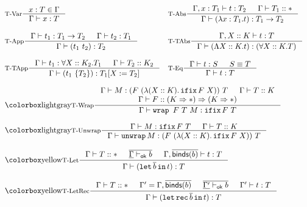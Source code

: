 \begin{figure}[!t]
  \centering
  \begin{displaymath}
  \begin{array}{ll}
  \inference[T-Var]{x:T \in \Gamma}{\Gamma |- x:T}  &
  \inference[T-Abs]{\Gamma, x:T_1 |- t:T_2 & \Gamma |- T_1 :: \Type}{\Gamma |- (\lambda x:T_1.t) : T_1 -> T_2} \\
  \\
  \inference[T-App]{\Gamma |- t_1 : T_1 -> T_2 & \Gamma |- t_2 : T_1}{\Gamma |- (t_1 ~ t_2) : T_2} &
  \inference[T-TAbs]{\Gamma, X::K |- t:T }{\Gamma |- (\Lambda X::K.t) : (\forall X::K.T)} \\
  \\
  \inference[T-TApp]{\Gamma |- t_1: \forall X::K_2.T_1  & \Gamma |- T_2 :: K_2} {\Gamma |- (t_1 ~\{T_2\}) : \substIn{X}{T_2}{T_1}} &
  \inference[T-Eq]{\Gamma |- t : S & S \equiv T}{\Gamma |- t : T} \\
  \\
  \multicolumn{2}{l}{\fomfDiff{\inference[T-Wrap]{\Gamma |- M: (F ~( \lambda (X :: K). \ifix F ~X)) ~T & \Gamma |- T:: K \\ \Gamma |- F :: (K\kindArrow\Type)\kindArrow (K\kindArrow\Type)}
          {\Gamma |- \wrap ~ F ~ T ~ M : \ifix F ~T} } }\\
  \\
  \multicolumn{2}{l}{\fomfDiff{\inference[T-Unwrap]{\Gamma |- M : \ifix F ~T & \Gamma |- T :: K }
          {\Gamma |- \unwrap M : (F ~( \lambda (X :: K). \ifix F ~X)) ~T  } } }\\
  \\
  \multicolumn{2}{l}{\firDiff{\inference[T-Let]{
  \Gamma |- T :: \Type &
  \seq{\fixed{\Gamma} \provesok b} &
  \Gamma, \seq{\binds{b}} |- t : T
  }
  { \Gamma |- (\tlet \seq{b} \tin t) : T
  }}}\\
  \\
  \multicolumn{2}{l}{\firDiff{\inference[T-LetRec]{
  \Gamma |- T :: \Type &
  \Gamma^\prime = \Gamma, \seq{\binds{b}} &
  \seq{\fixed{\Gamma^\prime} \provesok b} &
  \Gamma^\prime |- t : T
  }
  { \Gamma |- (\tlet \rec \seq{b} \tin t) : T
  }}}
  \end{array}
  \end{displaymath}
  \label{fig:fir_typing}
\end{figure}
